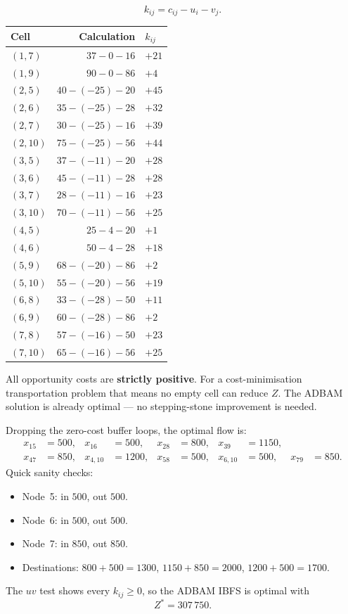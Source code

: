 \[
  k_{ij}=c_{ij}-u_i-v_j.
\]
\begin{center}
\begin{tabular}{@{}lrl@{}}
\toprule
Cell & Calculation & \(k_{ij}\) \\
\midrule
\((1,7)\) & \(37-0-16\) & \(+21\) \\
\((1,9)\) & \(90-0-86\) & \(+4\) \\
\((2,5)\) & \(40-(-25)-20\) & \(+45\) \\
\((2,6)\) & \(35-(-25)-28\) & \(+32\) \\
\((2,7)\) & \(30-(-25)-16\) & \(+39\) \\
\((2,10)\) & \(75-(-25)-56\) & \(+44\) \\
\((3,5)\) & \(37-(-11)-20\) & \(+28\) \\
\((3,6)\) & \(45-(-11)-28\) & \(+28\) \\
\((3,7)\) & \(28-(-11)-16\) & \(+23\) \\
\((3,10)\) & \(70-(-11)-56\) & \(+25\) \\
\((4,5)\) & \(25-4-20\) & \(+1\) \\
\((4,6)\) & \(50-4-28\) & \(+18\) \\
\((5,9)\) & \(68-(-20)-86\) & \(+2\) \\
\((5,10)\) & \(55-(-20)-56\) & \(+19\) \\
\((6,8)\) & \(33-(-28)-50\) & \(+11\) \\
\((6,9)\) & \(60-(-28)-86\) & \(+2\) \\
\((7,8)\) & \(57-(-16)-50\) & \(+23\) \\
\((7,10)\) & \(65-(-16)-56\) & \(+25\) \\
\bottomrule
\end{tabular}
\end{center}

\begin{warningbox}
All opportunity costs are \textbf{strictly positive}. For a cost-minimisation transportation
problem that means no empty cell can reduce \(Z\). The ADBAM solution is already optimal
--- no stepping-stone improvement is needed.
\end{warningbox}

Dropping the zero-cost buffer loops, the optimal flow is:
\begin{align*}
  x_{15}&=500,&
  x_{16}&=500,&
  x_{28}&=800,&
  x_{39}&=1150,\\
  x_{47}&=850,&
  x_{4,10}&=1200,&
  x_{58}&=500,&
  x_{6,10}&=500,&
  x_{79}&=850.
\end{align*}
Quick sanity checks:
\begin{itemize}
  \item Node~5: in \(500\), out \(500\).
  \item Node~6: in \(500\), out \(500\).
  \item Node~7: in \(850\), out \(850\).
  \item Destinations: \(800+500=1300\), \(1150+850=2000\), \(1200+500=1700\).
\end{itemize}

\begin{resultbox}[title={Part (d) --- optimal solution}]
The \(uv\) test shows every \(k_{ij}\ge 0\), so the ADBAM IBFS is optimal with
\[
  Z^*=307\,750.
\]
\end{resultbox}
